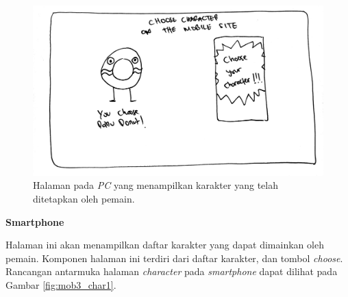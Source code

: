 \begin{enumerate}
\begin{figure}[H]
	\centering
	\includegraphics[scale=0.1]{Gambar/web3_char}
	\caption{Halaman pada \textit{PC} yang menampilkan karakter yang telah ditetapkan oleh pemain.}
	\label{fig:web3_char}
\end{figure}


	\textbf{Smartphone}
	
	Halaman ini akan menampilkan daftar karakter yang dapat dimainkan oleh pemain. Komponen halaman ini terdiri dari daftar karakter, dan tombol \textit{choose}. Rancangan antarmuka halaman \textit{character} pada \textit{smartphone} dapat dilihat pada Gambar \ref{fig:mob3_char1}.
	

\end{enumerate}
